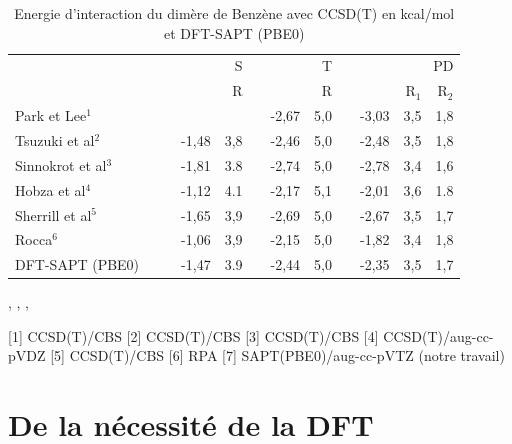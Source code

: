 \begin{table}[H]
\caption{Energie d'interaction du dimère de Benzène avec CCSD(T) en kcal/mol et DFT-SAPT (PBE0)}
\begin{center}
\begin{tabular}{l c r r r c r r c r r r}
\toprule
 & & & \multicolumn{2}{p{2cm}}{\centering S}  &	& \multicolumn{2}{p{2cm}}{\centering
  T}& &\multicolumn{3}{p{3cm}}{\centering PD}\\
  \cline{4-12}
 & & & & R & &  &  R & & & R$_{1}$ & R$_{2}$ \\
  \midrule
 Park et Lee$^{1}$ & & & &  & &-2,67& 5,0 & &-3,03 & 3,5 & 1,8\\
 Tsuzuki et al$^{2}$ & & & -1,48& 3,8 &  &-2,46& 5,0&  & -2,48 & 3,5& 1,8\\
 Sinnokrot et al$^{3}$ & & & -1,81 & 3.8 & &-2,74& 5,0&  & -2,78 & 3,4 & 1,6\\
 Hobza et al$^{4}$ & & &-1,12 & 4.1 &  &-2,17& 5,1& & -2,01 & 3,6 & 1.8\\
 Sherrill et al$^{5}$& &  & -1,65 & 3,9 & & -2,69& 5,0 & & -2,67 & 3,5 & 1,7 \\
 Rocca$^{6}$ & & & -1,06& 3,9& & -2,15& 5,0 & & -1,82 & 3,4 & 1,8\\ 
 DFT-SAPT (PBE0) & & & -1,47 & 3.9 &  &-2,44 &5,0& & -2,35& 3,5 &1,7\\
 \bottomrule
\end{tabular}
\end{center}
\centering
{},
,
,
   						
[1] CCSD(T)/CBS
[2] CCSD(T)/CBS 
[3] CCSD(T)/CBS
[4] CCSD(T)/aug-cc-pVDZ
[5] CCSD(T)/CBS 
[6] RPA
[7] SAPT(PBE0)/aug-cc-pVTZ (notre travail)
   						
\label{benzene}
\end{table}











\newpage
\section[DFT]{De la nécessité de la DFT}


